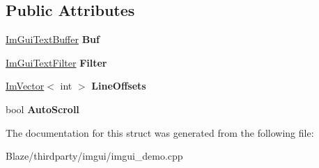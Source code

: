 \subsection*{Public Attributes}
\begin{DoxyCompactItemize}
\item 
\mbox{\label{structExampleAppLog_a74fb7cd7bd8c2507b41331ebb7d0e56d}} 
\hyperlink{structImGuiTextBuffer}{Im\+Gui\+Text\+Buffer} {\bfseries Buf}
\item 
\mbox{\label{structExampleAppLog_a4571947a6000e984ec8da9b7166e1e2b}} 
\hyperlink{structImGuiTextFilter}{Im\+Gui\+Text\+Filter} {\bfseries Filter}
\item 
\mbox{\label{structExampleAppLog_af197fca7116f9033a5a5e831ee764ee2}} 
\hyperlink{structImVector}{Im\+Vector}$<$ int $>$ {\bfseries Line\+Offsets}
\item 
\mbox{\label{structExampleAppLog_a6b32bf0242b10d45376a7b43a4bde2f5}} 
bool {\bfseries Auto\+Scroll}
\end{DoxyCompactItemize}


The documentation for this struct was generated from the following file\+:\begin{DoxyCompactItemize}
\item 
Blaze/thirdparty/imgui/imgui\+\_\+demo.\+cpp\end{DoxyCompactItemize}
